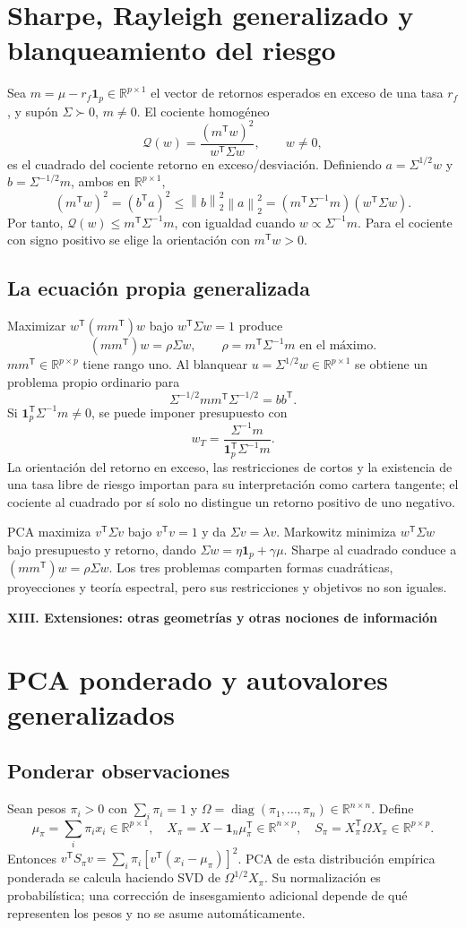 \documentclass[11pt,a4paper]{article}
\newcommand{\R}{\mathbb R}
\newcommand{\T}{^{\mathsf T}}
\newcommand{\norm}[1]{\left\lVert #1\right\rVert}
\DeclareMathOperator{\diag}{diag}
\newcommand{\ones}{\mathbf 1}
\theoremstyle{definition}
\newcommand{\parte}[1]{\par\bigskip\Needspace{8\baselineskip}\begin{center}{\Large\bfseries\color{azul}#1}\end{center}}
\begin{document}
\section{Sharpe, Rayleigh generalizado y blanqueamiento del riesgo}
Sea $m=\mu-r_f\ones_p\in\R^{p\times1}$ el vector de retornos esperados en exceso de una tasa $r_f$, y supón $\Sigma\succ0$, $m\ne0$. El cociente homogéneo
\[
\mathcal Q(w)=\frac{(m\T w)^2}{w\T\Sigma w},\qquad w\ne0,
\]
es el cuadrado del cociente retorno en exceso/desviación. Definiendo $a=\Sigma^{1/2}w$ y $b=\Sigma^{-1/2}m$, ambos en $\R^{p\times1}$,
\[
(m\T w)^2=(b\T a)^2\le\norm b_2^2\norm a_2^2
=(m\T\Sigma^{-1}m)(w\T\Sigma w).
\]
Por tanto, $\mathcal Q(w)\le m\T\Sigma^{-1}m$, con igualdad cuando $w\propto\Sigma^{-1}m$. Para el cociente con signo positivo se elige la orientación con $m\T w>0$.
\subsection{La ecuación propia generalizada}
Maximizar $w\T(mm\T)w$ bajo $w\T\Sigma w=1$ produce
\[
\boxed{(mm\T)w=\rho\Sigma w},\qquad \rho=m\T\Sigma^{-1}m\text{ en el máximo}.
\]
$mm\T\in\R^{p\times p}$ tiene rango uno. Al blanquear $u=\Sigma^{1/2}w\in\R^{p\times1}$ se obtiene un problema propio ordinario para
\[
\Sigma^{-1/2}mm\T\Sigma^{-1/2}=bb\T.
\]
Si $\ones_p\T\Sigma^{-1}m\ne0$, se puede imponer presupuesto con
\[
w_T=\frac{\Sigma^{-1}m}{\ones_p\T\Sigma^{-1}m}.
\]
La orientación del retorno en exceso, las restricciones de cortos y la existencia de una tasa libre de riesgo importan para su interpretación como cartera tangente; el cociente al cuadrado por sí solo no distingue un retorno positivo de uno negativo.
\begin{idea}
PCA maximiza $v\T\Sigma v$ bajo $v\T v=1$ y da $\Sigma v=\lambda v$. Markowitz minimiza $w\T\Sigma w$ bajo presupuesto y retorno, dando $\Sigma w=\eta\ones_p+\gamma\mu$. Sharpe al cuadrado conduce a $(mm\T)w=\rho\Sigma w$. Los tres problemas comparten formas cuadráticas, proyecciones y teoría espectral, pero sus restricciones y objetivos no son iguales.
\end{idea}

\parte{XIII. Extensiones: otras geometrías y otras nociones de información}
\section{PCA ponderado y autovalores generalizados}
\subsection{Ponderar observaciones}
Sean pesos $\pi_i>0$ con $\sum_i\pi_i=1$ y $\Omega=\diag(\pi_1,\ldots,\pi_n)\in\R^{n\times n}$. Define
\[
\mu_\pi=\sum_i\pi_i x_i\in\R^{p\times1},\quad
X_\pi=X-\ones_n\mu_\pi\T\in\R^{n\times p},\quad
S_\pi=X_\pi\T\Omega X_\pi\in\R^{p\times p}.
\]
Entonces $v\T S_\pi v=\sum_i\pi_i[v\T(x_i-\mu_\pi)]^2$. PCA de esta distribución empírica ponderada se calcula haciendo SVD de $\Omega^{1/2}X_\pi$. Su normalización es probabilística; una corrección de insesgamiento adicional depende de qué representen los pesos y no se asume automáticamente.
\end{document}
